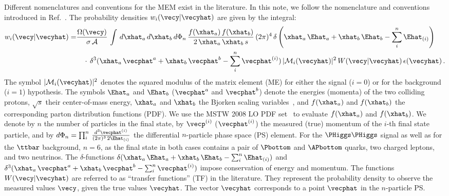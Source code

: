 Different nomenclatures and conventions for the MEM exist in the literature.
In this note, we follow the nomenclature and conventions introduced in Ref.~\cite{Volobouev:2011vb}.
The probability densities $w_{i}(\vecy|\vecyhat)$ are given by the integral:
\begin{align}
w_{i}(\vecy|\vecyhat) = & \frac{\Omega(\vecy)}{\sigma \, \mathcal{A}} \, \int \, d\xhat_{a} \, d\xhat_{b} \,
  d\Phi_{n} \, \frac{f(\xhat_{a}) \, f(\xhat_{b})}{2 \, \xhat_{a} \, \xhat_{b} \, s} \, (2\pi)^{4} \,
  \delta\left( \xhat_{a} \, \Ehat_{a} + \xhat_{b} \, \Ehat_{b} - \sum_{i}^{n} \Ehat_{(i)} \right) \nonumber \\
 & \quad \cdot \, \delta^{3}( \xhat_{a} \, \vecphat^{a} + \xhat_{b} \, \vecphat^{b} - \sum_{i}^{n} \vecphat^{(i)}) \, 
  \vert \mathcal{M}_{i}(\vecyhat) \vert^{2} \, W(\vecy|\vecyhat) \, \epsilon(\vecyhat) \, .
\label{eq:mem1}
\end{align}
The symbol $\vert \mathcal{M}_{i}(\vecyhat) \vert^{2}$ denotes the squared modulus of the matrix element (ME) for either the signal ($i=0$) or for the background ($i=1$) hypothesis.
The symbols $\Ehat_{a}$ and $\Ehat_{b}$ ($\vecphat^{a}$ and $\vecphat^{b}$) denote the energies (momenta) of the two colliding protons,
$\sqrt{s}$ their center-of-mass energy,
$\xhat_{a}$ and $\xhat_{b}$ the Bjorken scaling variables~\cite{Bjorkenx},
and $f(\xhat_{a})$ and $f(\xhat_{b})$ the corresponding parton distribution functions (PDF).
We use the MSTW 2008 LO PDF set~\cite{MSTW} to evaluate $f(\xhat_{a})$ and $f(\xhat_{b})$.
We denote by $n$ the number of particles in the final state,
by $\vecp^{(i)}$ ($\vecphat^{(i)}$) the measured (true) momentum of the $i$-th final state particle, and by 
$d\Phi_{n} = \prod_{i}^{n} \, \frac{d^{3}\vecphat^{(i)}}{(2\pi)^{3} \, 2 \Ehat_{(i)}}$ 
the differential $n$-particle phase space (PS) element.
For the $\PHiggs\PHiggs$ signal 
as well as for the $\ttbar$ background,
$n=6$, as the final state in both cases contains a pair of $\Pbottom$ and $\APbottom$ quarks, two charged leptons, and two neutrinos.
The $\delta$-functions $\delta( \xhat_{a} \, \Ehat_{a} + \xhat_{b} \, \Ehat_{b} - \sum_{i}^{n} \Ehat_{(i)})$
and $\delta^{3}( \xhat_{a} \, \vecphat^{a} + \xhat_{b} \, \vecphat^{b} - \sum_{i}^{n} \vecphat^{(i)})$ 
impose conservation of energy and momentum.
The functions $W(\vecy|\vecyhat)$ are referred to as ``transfer functions'' (TF) in the literature.
They represent the probability density to observe the measured values $\vecy$, given the true values $\vecyhat$.
The vector $\vecyhat$ corresponds to a point $\vecphat$ in the $n$-particle PS.
